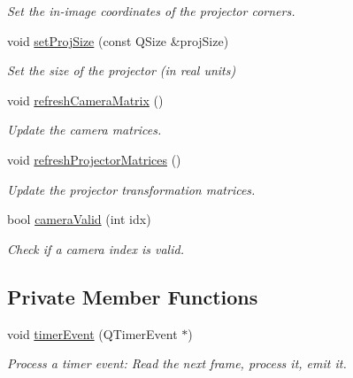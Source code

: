 \begin{DoxyCompactItemize}
\begin{DoxyCompactList}\small\item\em Set the in-\/image coordinates of the projector corners. \end{DoxyCompactList}\item 
void \hyperlink{classTrackingStream_a99326e76a6b511cdd6f49fdff67db235}{set\+Proj\+Size} (const Q\+Size \&proj\+Size)\hypertarget{classTrackingStream_a99326e76a6b511cdd6f49fdff67db235}{}\label{classTrackingStream_a99326e76a6b511cdd6f49fdff67db235}

\begin{DoxyCompactList}\small\item\em Set the size of the projector (in real units) \end{DoxyCompactList}\item 
void \hyperlink{classTrackingStream_aac16a6fcb195581434fbd049944524a3}{refresh\+Camera\+Matrix} ()\hypertarget{classTrackingStream_aac16a6fcb195581434fbd049944524a3}{}\label{classTrackingStream_aac16a6fcb195581434fbd049944524a3}

\begin{DoxyCompactList}\small\item\em Update the camera matrices. \end{DoxyCompactList}\item 
void \hyperlink{classTrackingStream_adadff3452ad54ec239cbdeaf687863a0}{refresh\+Projector\+Matrices} ()\hypertarget{classTrackingStream_adadff3452ad54ec239cbdeaf687863a0}{}\label{classTrackingStream_adadff3452ad54ec239cbdeaf687863a0}

\begin{DoxyCompactList}\small\item\em Update the projector transformation matrices. \end{DoxyCompactList}\item 
bool \hyperlink{classTrackingStream_a7579ead32eb9110b84f8665c9eb6f72d}{camera\+Valid} (int idx)
\begin{DoxyCompactList}\small\item\em Check if a camera index is valid. \end{DoxyCompactList}\end{DoxyCompactItemize}
\subsection*{Private Member Functions}
\begin{DoxyCompactItemize}
\item 
void \hyperlink{classTrackingStream_abf01ea9fb604e3d748c28827562b3a6e}{timer\+Event} (Q\+Timer\+Event $\ast$)
\begin{DoxyCompactList}\small\item\em Process a timer event\+: Read the next frame, process it, emit it. \end{DoxyCompactList}\end{DoxyCompactItemize}
